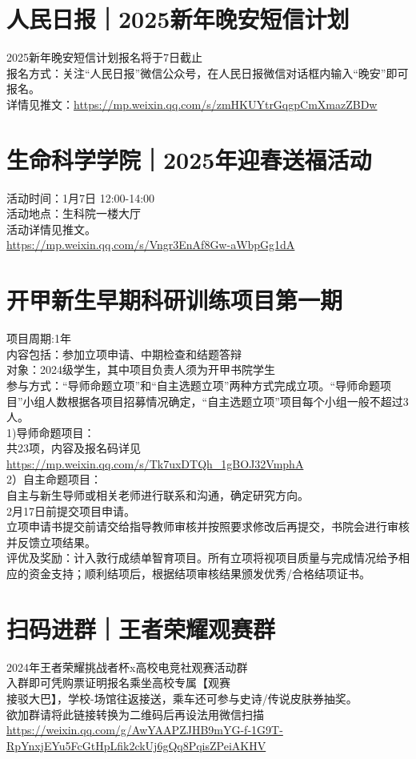 \documentclass[letterpaper, 12pt]{article}
\begin{document}
\begin{multicols}{2}
\section{人民日报｜2025新年晚安短信计划}
2025新年晚安短信计划报名将于7日截止\\
报名方式：关注“人民日报”微信公众号，在人民日报微信对话框内输入“晚安”即可报名。\\
详情见推文：\url{https://mp.weixin.qq.com/s/zmHKUYtrGqgpCmXmazZBDw}
\section{生命科学学院｜2025年迎春送福活动}
活动时间：1月7日 12:00-14:00\\
活动地点：生科院一楼大厅\\
活动详情见推文。\\
\url{https://mp.weixin.qq.com/s/Vngr3EnAf8Gw-aWbpGg1dA
}
\section{开甲新生早期科研训练项目第一期}
项目周期:1年\\
内容包括：参加立项申请、中期检查和结题答辩\\
对象：2024级学生，其中项目负责人须为开甲书院学生\\
参与方式：“导师命题立项”和“自主选题立项”两种方式完成立项。“导师命题项目”小组人数根据各项目招募情况确定，“自主选题立项”项目每个小组一般不超过3人。\\
1)导师命题项目：\\
共23项，内容及报名码详见\url{https://mp.weixin.qq.com/s/Tk7uxDTQh_1gBOJ32VmphA}\\
2）自主命题项目：\\
自主与新生导师或相关老师进行联系和沟通，确定研究方向。\\
2月17日前提交项目申请。\\
立项申请书提交前请交给指导教师审核并按照要求修改后再提交，书院会进行审核并反馈立项结果。\\
评优及奖励：计入敦行成绩单智育项目。所有立项将视项目质量与完成情况给予相应的资金支持；顺利结项后，根据结项审核结果颁发优秀/合格结项证书。
\section{扫码进群｜王者荣耀观赛群}
2024年王者荣耀挑战者杯x高校电竞社观赛活动群\\
入群即可凭购票证明报名乘坐高校专属【观赛\\
接驳大巴】，学校-场馆往返接送，乘车还可参与史诗/传说皮肤券抽奖。\\
欲加群请将此链接转换为二维码后再设法用微信扫描\url{https://weixin.qq.com/g/AwYAAPZJHB9mYG-f-1G9T-RpYnxjEYu5FcGtHpLfik2ckUj6gQq8PqisZPeiAKHV}

\end{multicols} 
\end{document}
